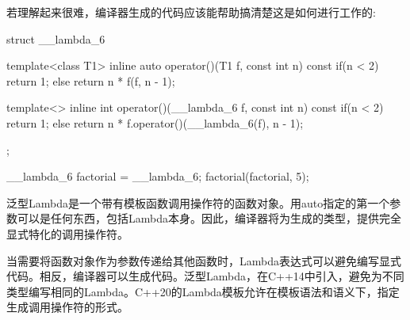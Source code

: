 若理解起来很难，编译器生成的代码应该能帮助搞清楚这是如何进行工作的:

\begin{cpp}
struct __lambda_6
{
	template<class T1>
	inline auto operator()(T1 f, const int n) const
	{
		if(n < 2) return 1;
		else return n * f(f, n - 1);
	}

	template<>
	inline int operator()(__lambda_6 f, const int n) const
	{
		if(n < 2) return 1;
		else return n * f.operator()(__lambda_6(f), n - 1);
	}
};

__lambda_6 factorial = __lambda_6{};
factorial(factorial, 5);
\end{cpp}

泛型Lambda是一个带有模板函数调用操作符的函数对象。用auto指定的第一个参数可以是任何东西，包括Lambda本身。因此，编译器将为生成的类型，提供完全显式特化的调用操作符。

当需要将函数对象作为参数传递给其他函数时，Lambda表达式可以避免编写显式代码。相反，编译器可以生成代码。泛型Lambda，在C++14中引入，避免为不同类型编写相同的Lambda。C++20的Lambda模板允许在模板语法和语义下，指定生成调用操作符的形式。


